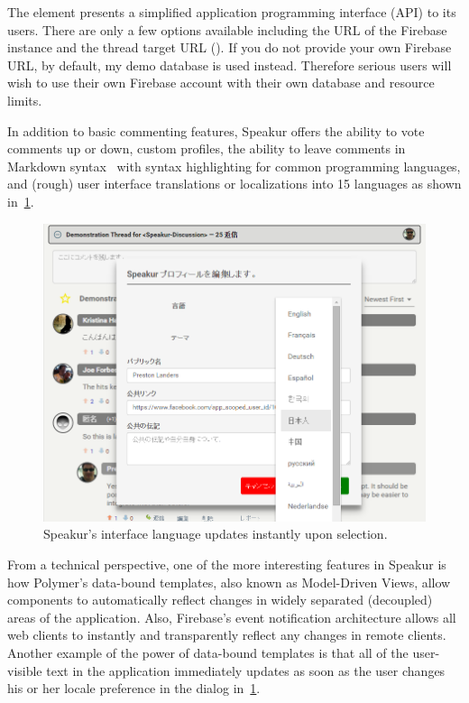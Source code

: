The  element presents a simplified application programming interface (API) to its users.
There are only a few options available including the URL of the Firebase instance and the thread target URL ().
If you do not provide your own Firebase URL, by default, my demo database is used instead.
Therefore serious users will wish to use their own Firebase account with their own database and resource limits.

In addition to basic commenting features, Speakur offers the ability to vote comments up or down, custom profiles, 
the ability to leave comments in Markdown syntax~\cite{githubcontributors2015} with syntax highlighting for common programming languages, 
and (rough) user interface translations  or localizations 
into 15 languages as shown in~\cref{f:lang}.

\begin{figure}[htb]
\centering
 \includegraphics[width=\textwidth]{images/screenshot_20150320_1923_lang.png}
\caption{Speakur's interface language updates instantly upon selection.}
\label{f:lang}
\end{figure}

From a technical perspective, one of the more interesting features in Speakur is how Polymer's data-bound templates, also known as Model-Driven Views, 
allow components to automatically reflect changes in widely separated (decoupled) areas of the application.
Also, Firebase's event notification architecture allows all web clients to instantly and transparently reflect any changes in remote clients.
Another example of the power of data-bound templates is that all of the user-visible text in the application immediately updates as soon as the user changes his or her locale preference in the dialog in~\cref{f:lang}.

